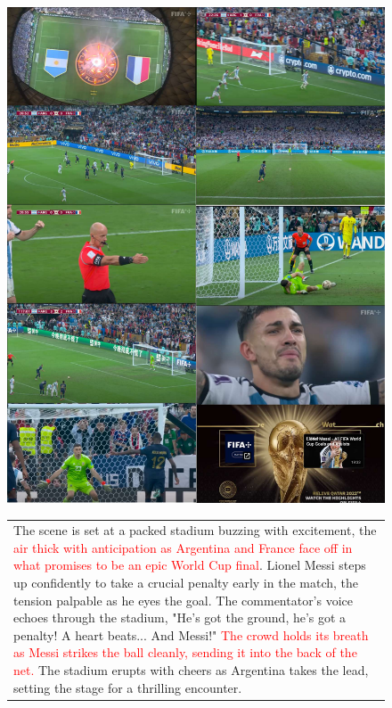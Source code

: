 \begin{landscape}
  \begin{figure}[t]
    \begin{minipage}[c]{0.7\textwidth}
            \centering
            \includegraphics[width=\textwidth]{images/argentina-france-qualitative_compressed.pdf}
        \end{minipage}
        \begin{minipage}[c]{0.8\textwidth}
    \small
    \centering
    \scriptsize
    \begin{tabular}{p{12cm}}
        The scene is set at a packed stadium buzzing with excitement, the \textcolor{red}{air thick with anticipation as Argentina and France face off in what promises to be an epic World Cup final}. Lionel Messi steps up confidently to take a crucial penalty early in the match, the tension palpable as he eyes the goal. The commentator's voice echoes through the stadium, "He's got the ground, he's got a penalty! A heart beats... And Messi!" \textcolor{red}{The crowd holds its breath as Messi strikes the ball cleanly, sending it into the back of the net.} The stadium erupts with cheers as Argentina takes the lead, setting the stage for a thrilling encounter.
        

\end{tabular}
\end{minipage}
\end{figure}
\end{landscape}

